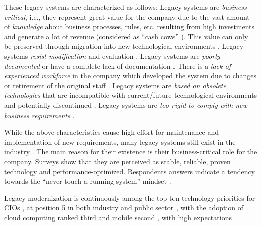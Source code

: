 These legacy systems are characterized as follows: Legacy systems are \emph{business critical}, i.e., they represent great value for the company due to the vast amount of \emph{knowledge} about business processes, rules, etc.
\autocite{Aversano2001,Sneed2010SoftwareMigration,Wagner2014Fundamentals} resulting from high investments \autocite{Lucia2009METAMORPHOS} and generate a lot of revenue (considered as ``cash cows'' \autocite{Khadka2014ProfessionalsModernization}).
This value can only be preserved through migration into new technological environments \autocite{Fuhr2013SOAMIG}.
Legacy systems \emph{resist modification} and evaluation \autocite{Bisbal1999LegacyInformationSystems}.
Legacy systems are \emph{poorly documented} or have a complete lack of documentation \autocite{Sneed2010SoftwareMigration,warren2012renaissance,Batlajery2014IndustrialSurveyModernization,Lucia2008}.
There is a \emph{lack of experienced workforce} in the company which developed the system \autocite{Batlajery2014IndustrialSurveyModernization} due to changes or retirement of the original staff \autocite{Lucia2008}.
Legacy systems are \emph{based on obsolete technologies} that are incompatible with current/future technological environments and potentially discontinued \autocite{Perez-Castillo2013PRECISO,Batlajery2014IndustrialSurveyModernization,Heil2016AWSM}.
Legacy systems are \emph{too rigid to comply with new business requirements} \autocite{Batlajery2014IndustrialSurveyModernization}.

While the above characteristics cause high effort for maintenance and implementation of new requirements, many legacy systems still exist in the industry \autocite{Fuhr2013SOAMIG}.
The main reason for their existence is their business-critical role for the company.
Surveys \autocite{Khadka2014ProfessionalsModernization,Batlajery2014IndustrialSurveyModernization} show that they are perceived as stable, reliable, proven technology and performance-optimized.
Respondents answers indicate a tendency towards the ``never touch a running system'' mindset \autocite{Batlajery2014IndustrialSurveyModernization}.

Legacy modernization is continuously among the top ten technology priorities for CIOs \autocite{Gartner2013CIOAgenda}, at position 5 in both industry \autocite{Gartner2013Priorities} and public sector \autocite{NASCIO2016}, with the adoption of cloud computing ranked third \autocite{Gartner2013Priorities,NASCIO2016} and mobile second \autocite{Gartner2013Priorities}, with high expectations \autocite{ForresterResearch2011Modernization}.

